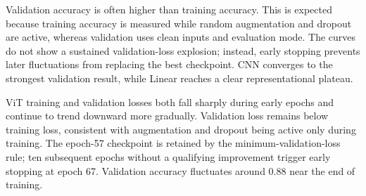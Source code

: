 Validation accuracy is often higher than training accuracy. This is expected because training accuracy is measured while random augmentation and dropout are active, whereas validation uses clean inputs and evaluation mode. The curves do not show a sustained validation-loss explosion; instead, early stopping prevents later fluctuations from replacing the best checkpoint. CNN converges to the strongest validation result, while Linear reaches a clear representational plateau.

ViT training and validation losses both fall sharply during early epochs and continue to trend downward more gradually. Validation loss remains below training loss, consistent with augmentation and dropout being active only during training. The epoch-57 checkpoint is retained by the minimum-validation-loss rule; ten subsequent epochs without a qualifying improvement trigger early stopping at epoch 67. Validation accuracy fluctuates around 0.88 near the end of training.
